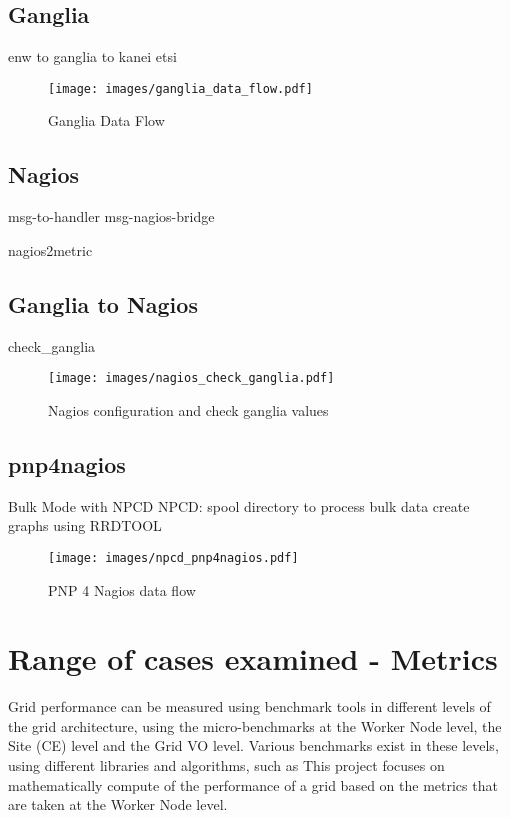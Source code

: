 \newpage

\subsection{Ganglia}
enw to ganglia to kanei etsi
\newpage

\begin{figure}[htb]
\centering
 \texttt{[image: images/ganglia\_data\_flow.pdf]}
\caption{Ganglia Data Flow}
\label{figure:ganglia_dataflow}
\end{figure}
\newpage

\subsection{Nagios}
msg-to-handler msg-nagios-bridge
\newpage

nagios2metric
\newpage

\subsection{Ganglia to Nagios}
check\_ganglia
\begin{figure}[htb]
\centering
 \texttt{[image: images/nagios\_check\_ganglia.pdf]}
\caption{Nagios configuration and check ganglia values}
\label{figure:nagios_ganglia}
\end{figure}
\newpage

\subsection{pnp4nagios}

Bulk Mode with NPCD
NPCD:
spool directory to process bulk data
create graphs using RRDTOOL

\begin{figure}[htb]
\centering
 \texttt{[image: images/npcd\_pnp4nagios.pdf]}
\caption{PNP 4 Nagios data flow}
\label{figure:pnp4nagios}
\end{figure}
\newpage

\section{Range of cases examined - Metrics}

Grid performance can be measured using benchmark tools in different levels of
the grid architecture, using the micro-benchmarks at the Worker Node level, the
Site (CE) level and the Grid VO level. Various benchmarks exist in these
levels, using different libraries and algorithms, such as  This project focuses
on mathematically compute of the performance of a grid based on the metrics that
are taken at the Worker Node level.

